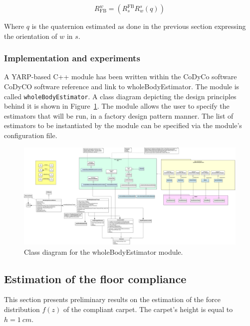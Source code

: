 \documentclass[12pt,a4paper,twoside]{article}
\begin{document}
\begin{equation}
    R_{\text{FB}}^{w} = (R_{s}^{\text{FB}} R_{w}^{s}(q))
\end{equation}

Where $q$ is the quaternion estimated as done in the previous section expressing the orientation of $w$ in ${s}$.

\subsubsection{Implementation and experiments}
\label{sec:implementation-wholebodyestimator}
A YARP-based C++ module has been written within the CoDyCo software {CoDyCO software reference and link to wholeBodyEstimator}. The module is called \verb|wholeBodyEstimator|. A class diagram depicting the design principles behind it is shown in Figure~\ref{fig:wholebodyestimator-class-diagram}. The module allows the user to specify the estimators that will be run, in a factory design pattern manner. The list of estimators to be instantiated by the module can be specified via the module's configuration file. 

\begin{figure}
    \centering
    \includegraphics[width=0.7\paperheight, angle=90]{images/wholebodyestimator-class-diagram.png}
    \caption{Class diagram for the wholeBodyEstimator module.}
    \label{fig:wholebodyestimator-class-diagram}
\end{figure}


\subsection{Estimation of the floor compliance} 
\label{sec:estimationFloorCompliance}

This section presents preliminary results on the estimation of the force distribution $f(z)$ of the compliant carpet. The carpet's height is equal to $h = 1 \ cm$. 
\begin{figure}[t]
\end{figure}
\end{document}
